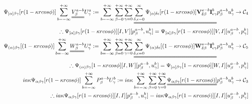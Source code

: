 \documentclass{Note}
\begin{document}
\begin{equation}
\begin{aligned}
\Psi_{[\alpha]\beta\gamma} [r(1-\kappa rcos\phi)] \sum_{b=-\infty}^{+\infty}\uuline{V_\beta^{a-b}}U_\gamma^a:=\sum_{b=-\infty}^{+\infty}\sum_{\beta=0}^{+\infty}\sum_{\gamma=0}^{+\infty}\uuline{\sum_{\delta,\epsilon=0}^\infty \Psi_{[\alpha]\delta\epsilon}[r(1-\kappa r cos\phi)]\textbf{V}_{\delta\beta}^{a-b}\textbf{I}_{\epsilon\gamma}^{b}}p_\beta^{a-b}u_\gamma^{b}\rightarrow \mathcal{C}_4\\
\therefore \Psi_{[\alpha]\beta\gamma}[r(1-\kappa r cos\phi)][I,V][p_\beta^{a-b},u_\gamma^{b}]=\Psi_{[\alpha]\beta\gamma}[r(1-\kappa r cos\phi)][V,I][u_\beta^{a-b},p_\gamma^{b}]\\
\Psi_{(\alpha)\beta\gamma} [(1-\kappa rcos\phi)]\sum_{b=-\infty}^{+\infty}\uuline{W_\beta^{a-b}}U_\gamma^a:=\sum_{b=-\infty}^{+\infty}\sum_{\beta=0}^{+\infty}\sum_{\gamma=0}^{+\infty}\uuline{\sum_{\delta,\epsilon=0}^\infty \Psi_{(\alpha)\delta\epsilon}[(1-\kappa r cos\phi)]\textbf{W}_{\delta\beta}^{a-b}\textbf{I}_{\epsilon\gamma}^{b}}p_\beta^{a-b}u_\gamma^{b}\rightarrow \mathcal{C}_5\\
\therefore \Psi_{(\alpha)\beta\gamma}[1-\kappa r cos\phi][I,W][p_\beta^{a-b},u_\gamma^{b}]=\Psi_{[\alpha]\beta\gamma}[1-\kappa r cos\phi][W,I][u_\beta^{a-b},p_\gamma^{b}]\\
ia\kappa \Psi_{\alpha\beta\gamma}[r(1-\kappa r cos\phi)]\sum_{b=-\infty}^{+\infty}P_\beta^{a-b}U_\gamma^{b}:=ia\kappa \sum_{b=-\infty}^{+\infty} \sum_{\beta=0}^{+\infty}\sum_{\gamma=0}^{+\infty}\uuline{ \Psi_{\alpha\beta\gamma}[r(1-\kappa r cos\phi)]}p_\beta^{a-b}u_\gamma^{b}\rightarrow \mathcal{C}_3\\
\therefore ia\kappa \Psi_{\alpha\beta\gamma}[r(1-\kappa r cos\phi)][I,I][p_\beta^{a-b},u_\gamma^{b}]= ia\kappa \Psi_{\alpha\beta\gamma}[r(1-\kappa r cos\phi)][I,I][u_\beta^{a-b},p_\gamma^{b}]\\
\end{aligned}
\end{equation}
\end{document}
